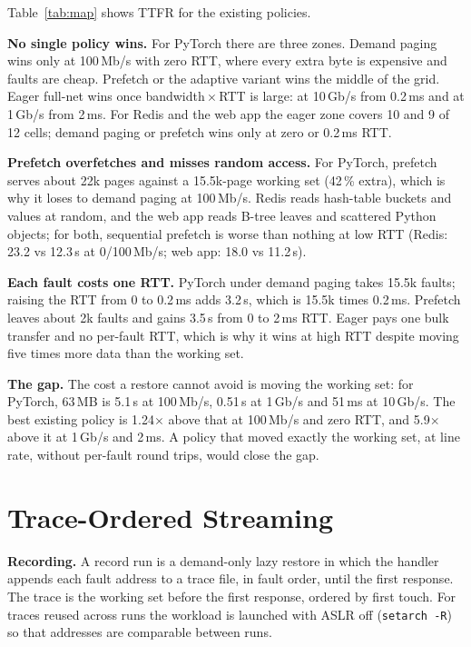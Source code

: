 \documentclass[conference]{IEEEtran}
\newcommand{\mode}[1]{\textsf{#1}}
\begin{document}
Table~\ref{tab:map} shows TTFR for the existing policies.

\textbf{No single policy wins.} For PyTorch there are three zones. Demand
paging wins only at 100\,Mb/s with zero RTT, where every extra byte is
expensive and faults are cheap. Prefetch or the adaptive variant wins the
middle of the grid. Eager \mode{full-net} wins once bandwidth${}\times{}$RTT
is large: at 10\,Gb/s from 0.2\,ms and at 1\,Gb/s from 2\,ms. For Redis
and the web app the eager zone covers 10 and 9 of 12 cells; demand paging
or prefetch wins only at zero or 0.2\,ms RTT.

\textbf{Prefetch overfetches and misses random access.} For PyTorch,
prefetch serves about 22k pages against a 15.5k-page working set (42\,\%
extra), which is why it loses to demand paging at 100\,Mb/s. Redis reads
hash-table buckets and values at random, and the web app reads B-tree
leaves and scattered Python objects; for both, sequential prefetch is worse
than nothing at low RTT (Redis: 23.2 vs 12.3\,s at 0/100\,Mb/s; web app:
18.0 vs 11.2\,s).

\textbf{Each fault costs one RTT.} PyTorch under demand paging takes 15.5k
faults; raising the RTT from 0 to 0.2\,ms adds 3.2\,s, which is 15.5k
times 0.2\,ms. Prefetch leaves about 2k faults and gains 3.5\,s from 0 to
2\,ms RTT. Eager pays one bulk transfer and no per-fault RTT, which is
why it wins at high RTT despite moving five times more data than the
working set.

\textbf{The gap.} The cost a restore cannot avoid is moving the working set:
for PyTorch, 63\,MB is 5.1\,s at 100\,Mb/s, 0.51\,s at 1\,Gb/s and 51\,ms at
10\,Gb/s. The best existing policy is 1.24$\times$ above that at 100\,Mb/s
and zero RTT, and 5.9$\times$ above it at 1\,Gb/s and 2\,ms. A policy that
moved exactly the working set, at line rate, without per-fault round trips,
would close the gap.

\section{Trace-Ordered Streaming}
\label{sec:design}

\textbf{Recording.} A record run is a demand-only lazy restore in which the
handler appends each fault address to a trace file, in fault order, until
the first response. The trace is the working set before the first response,
ordered by first touch. For traces reused across runs the workload is
launched with ASLR off (\texttt{setarch -R}) so that addresses are
comparable between runs.
\end{document}
